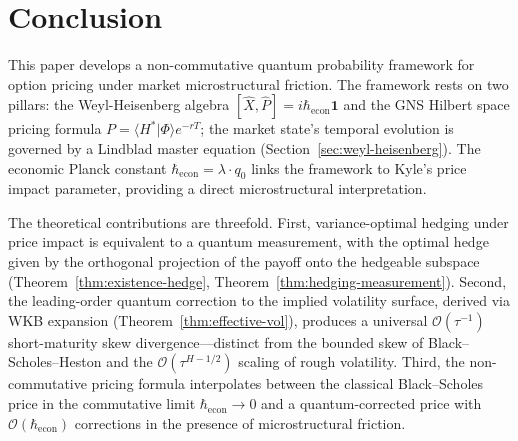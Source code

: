 
\section{Conclusion}\label{sec:conclusion}

This paper develops a non-commutative quantum probability framework for option
pricing under market microstructural friction. The framework rests on two
pillars: the Weyl-Heisenberg algebra
$[\hat{X}, \hat{P}] = i\hbar_{\mathrm{econ}} \mathbf{1}$ and the GNS Hilbert
space pricing formula $P = \langle H^* | \Phi \rangle e^{-rT}$; the market
state's temporal evolution is governed by a Lindblad master equation
(Section~\ref{sec:weyl-heisenberg}). The economic Planck constant
$\hbar_{\mathrm{econ}} = \lambda \cdot q_0$ links the framework to Kyle's price
impact parameter, providing a direct microstructural interpretation.

The theoretical contributions are threefold. First, variance-optimal hedging
under price impact is equivalent to a quantum measurement, with the optimal
hedge given by the orthogonal projection of the payoff onto the hedgeable
subspace (Theorem~\ref{thm:existence-hedge}, Theorem~\ref{thm:hedging-measurement}).
Second, the leading-order quantum correction to the implied volatility surface,
derived via WKB expansion (Theorem~\ref{thm:effective-vol}), produces a universal
$\mathcal{O}(\tau^{-1})$ short-maturity skew divergence---distinct from the
bounded skew of Black--Scholes--Heston and the $\mathcal{O}(\tau^{H-1/2})$
scaling of rough volatility. Third, the non-commutative pricing formula
interpolates between the classical Black--Scholes price in the commutative
limit $\hbar_{\mathrm{econ}} \to 0$ and a quantum-corrected price with
$\mathcal{O}(\hbar_{\mathrm{econ}})$ corrections in the presence of
microstructural friction.

